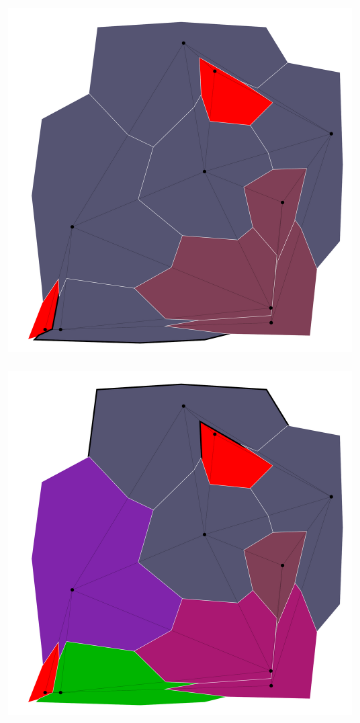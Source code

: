 \documentclass{article}
\begin{document}
\begin{figure}[h!]
\begin{subfigure}{0.18\textwidth}
				\includegraphics[width=\textwidth]{images/sequences/forward_backtracking/bt_forward_I00005}
				\caption{}
			\end{subfigure}
			\;
			\begin{subfigure}{0.18\textwidth}
				\centering
				\includegraphics[width=\textwidth]{images/sequences/forward_backtracking/bt_forward_I00007}

\end{subfigure}
\end{figure}
\end{document}
